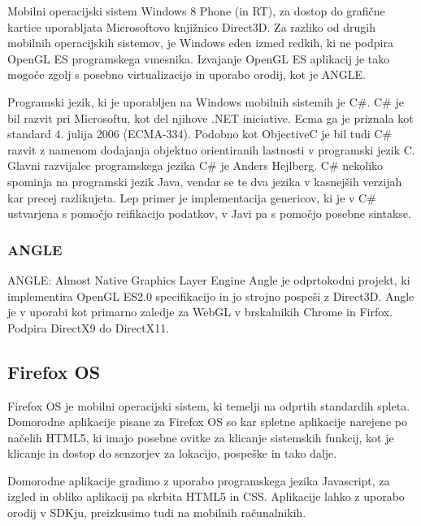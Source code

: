 % 

Mobilni operacijski sistem Windows 8 Phone (in RT), za dostop do grafične kartice uporabljata Microsoftovo knjižnico Direct3D. Za razliko od drugih mobilnih operacijskih sistemov, je Windows eden izmed redkih, ki ne podpira OpenGL ES programskega vmesnika. Izvajanje OpenGL ES aplikacij je tako mogoče zgolj s posebno virtualizacijo in uporabo orodij, kot je ANGLE.

Programski jezik, ki je uporabljen na Windows mobilnih sistemih je C\#. C\# je bil razvit pri Microsoftu, kot del njihove .NET iniciative. Ecma ga je priznala kot standard 4. julija 2006 (ECMA-334). Podobno kot ObjectiveC je bil tudi C\# razvit z namenom dodajanja objektno orientiranih lastnosti v programski jezik C. Glavni razvijalec programskega jezika C\# je Anders Hejlberg. C\# nekoliko spominja na programski jezik Java, vendar se te dva jezika v kasnejših verzijah kar precej razlikujeta. Lep primer je implementacija genericov, ki je v C\# ustvarjena s pomočjo reifikacijo podatkov, v Javi pa s pomočjo posebne sintakse. 

\subsubsection{ANGLE}
ANGLE: Almost Native Graphics Layer Engine
Angle je odprtokodni projekt, ki implementira OpenGL ES2.0 specifikacijo in jo strojno pospeši z Direct3D. Angle je v uporabi kot primarno zaledje za WebGL v brskalnikih Chrome in Firfox. Podpira DirectX9 do DirectX11.  


\subsection{Firefox OS}

Firefox OS je mobilni operacijski sistem, ki temelji na odprtih standardih spleta. Domorodne aplikacije pisane za Firefox OS so kar spletne aplikacije narejene po načelih HTML5, ki imajo posebne ovitke za klicanje sistemskih funkcij, kot je klicanje in dostop do senzorjev za lokacijo, pospeške in tako dalje.

Domorodne aplikacije gradimo z uporabo programskega jezika Javascript, za izgled in obliko aplikacij pa skrbita HTML5 in CSS. Aplikacije lahko z uporabo orodij v SDKju, preizkusimo tudi na mobilnih računalnikih.

